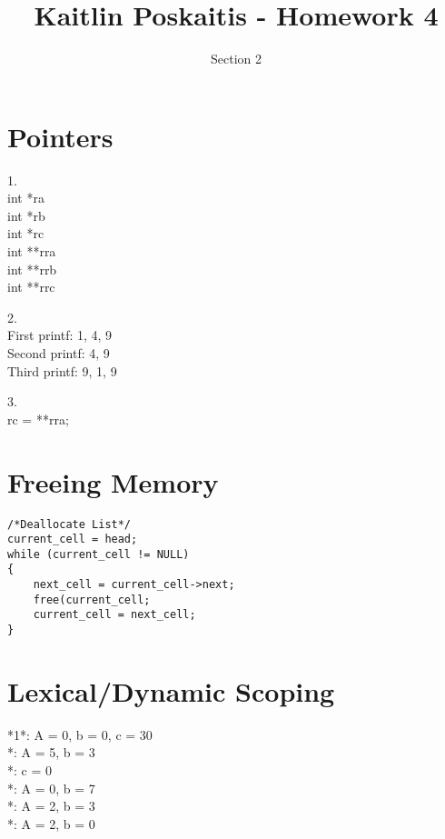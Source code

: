 \documentclass[11pt]{article}
\title{\bf Kaitlin Poskaitis - Homework 4}
\author{Section 2}
\date{}
\begin{document}
\maketitle

\section{Pointers}

1.\\  
\indent\indent int *ra \\
\indent\indent int *rb \\
\indent\indent int *rc \\
\indent\indent int **rra \\
\indent\indent int **rrb\\
\indent\indent int **rrc

2.\\ 
\indent\indent First printf: 1, 4, 9\\
\indent\indent Second printf: 4, 9\\
\indent\indent Third printf: 9, 1, 9


3.\\
\indent\indent rc = **rra;

\section{Freeing Memory}

\begin{lstlisting}
/*Deallocate List*/
current_cell = head;
while (current_cell != NULL)
{
	next_cell = current_cell->next;
	free(current_cell;
	current_cell = next_cell;
}

\end{lstlisting}

\section{Lexical/Dynamic Scoping}

*1*: A = 0, b = 0, c = 30\\
*: A = 5, b = 3\\
*: c = 0\\
*: A = 0, b = 7\\
*: A = 2, b = 3 \\
*: A = 2, b = 0\\
\end{document}

